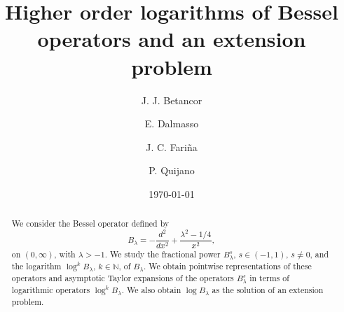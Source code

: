 \documentclass[a4paper,10pt, reqno]{amsart}
\theoremstyle{definition}
\theoremstyle{remark}
\numberwithin{equation}{section}
\begin{document}
\title[Higher order logarithms of Bessel operators and an extension problem]{Higher order logarithms of Bessel operators and an extension problem}
\author[J. J. Betancor]{J. J. Betancor}

\author[E. Dalmasso]{E. Dalmasso}

\author[J. C. Fari\~na]{J. C. Fari\~na}

\author[P. Quijano] {P. Quijano}


\address{Jorge J. Betancor, Juan Carlos Fari\~na\newline
	Departamento de An\'alisis Matem\'atico, Universidad de La Laguna,\newline
	Campus de Anchieta, Avda. Astrof\'isico S\'anchez, s/n, La Laguna (Sta. Cruz de Tenerife), Spain}

\address{Estefan\'{\i}a Dalmasso, Pablo Quijano\newline
	Instituto de Matem\'atica Aplicada del Litoral, UNL, CONICET, FIQ\newline
    Colectora Ruta Nac. Nº 168, Paraje El Pozo,\newline
    S3007ABA, Santa Fe, Argentina}





\renewcommand{\datename}{Last modified:}
\date{\today}



\begin{abstract}
We consider the Bessel operator defined by 
\[
B_\lambda =-\frac{d^2}{dx^2}+\frac{\lambda^2-1/4}{x^2},
\]
on $(0,\infty)$, with $\lambda>-1$. We study the fractional power $B_\lambda^s$, $s\in (-1,1)$, $s\neq 0$, and the logarithm $\log^kB_\lambda $, $k\in \mathbb N$, of $B_\lambda$. We obtain pointwise representations of these operators and asymptotic Taylor expansions of  the operators $B_\lambda^s$ in terms of logarithmic operators $\log^kB_\lambda $. We also obtain $\log B_\lambda$ as the solution of an extension problem.
\end{abstract}

\maketitle
\end{document}
